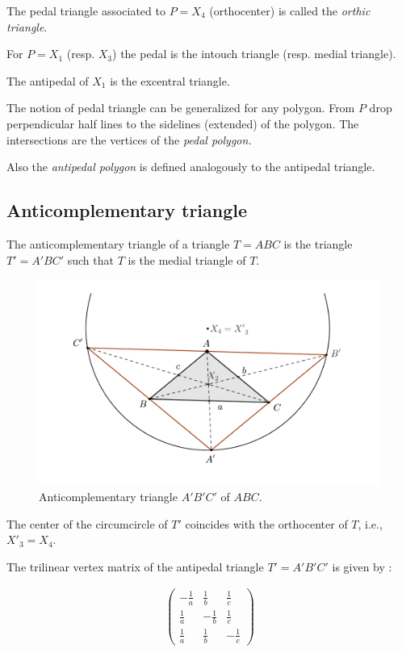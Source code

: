 The pedal triangle associated to  $P=X_4$ (orthocenter) is called the {\em orthic triangle}.
 
 For $P=X_1$ (resp. $X_3$) the pedal is the intouch triangle (resp. medial triangle). 
 
 The antipedal of $X_1$ is the excentral triangle.

The notion of pedal triangle  can be generalized for any polygon. From $P$ drop perpendicular half lines to the sidelines (extended) of the polygon. The intersections are the vertices of the {\em pedal polygon.}

Also the {\em  antipedal polygon} is defined analogously to the antipedal triangle.
 
 \subsection{ Anticomplementary triangle}
 
 The anticomplementary triangle of a triangle $T=ABC$ is the triangle $T'=A'BC'$ such that $T$ is the medial triangle of $T$.
 
  \begin{figure}[H]
     \centering
      \includegraphics[scale=0.6]{zappA/pics/pics_appA_0100_anticimplementary.pdf}
    \caption{Anticomplementary triangle $A'B'C'$ of $ABC$.}
    \label{fig:pedal_triangle}
\end{figure}
The center of the circumcircle of $T'$ coincides with the orthocenter of $T$, i.e., $X'_3=X_4$.

The trilinear vertex matrix of the antipedal triangle $T'=A'B'C'$ is given by \cite{mw}:
 
\begin{align*}
   \left(\begin{matrix}-\frac{1}{a} &\frac{1}{b} &\frac{1}{c}\\
    \frac{1}{a} &-\frac{1}{b} &\frac{1}{c}\\
    \frac{1}{a} &\frac{1}{b} &-\frac{1}{c}\end{matrix}\right)
    \end{align*}
   